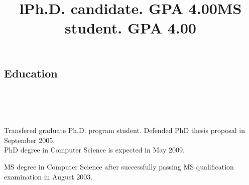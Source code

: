 \documentclass[12pt,overlapped,line]{res}
\begin{document}
\begin{resume}





\section{Education}
\begin{format}
  \title{l}\\
  \\
  \body\\
\end{format}

\title{Ph.D. candidate. GPA 4.00}
\begin{position}
  Transfered graduate Ph.D. program student. Defended PhD thesis proposal in
  September 2005.\\
  PhD degree in Computer Science is expected in May 2009.
\end{position}

 \title{MS student. GPA 4.00}
 \begin{position}
  MS degree in Computer Science after successfully passing MS
 qualification examination in August 2003.
 \end{position}


\end{resume}
\end{document}
